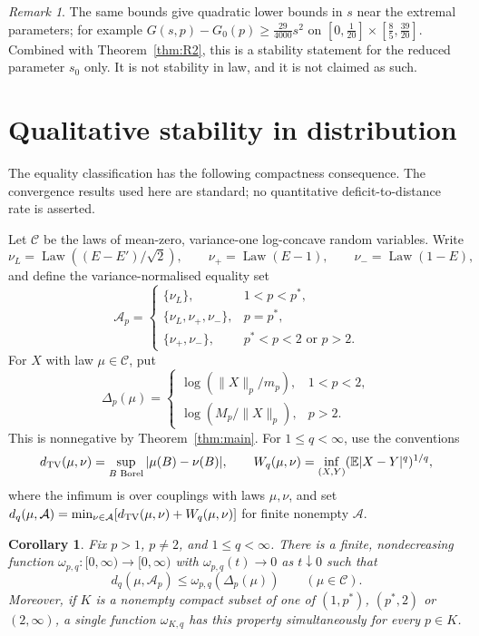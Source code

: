 \documentclass[11pt]{article}
\newtheorem{corollary}[theorem]{Corollary}
\theoremstyle{remark}
\newtheorem{remark}[theorem]{Remark}
\newcommand{\E}{\mathbb E}
\begin{document}
\begin{remark}
The same bounds give quadratic lower bounds in $s$ near the extremal parameters; for example $G(s,p)-G_0(p)\ge\frac{29}{4000}s^2$ on $[0,\frac1{20}]\times[\frac85,\frac{39}{20}]$. Combined with Theorem~\ref{thm:R2}, this is a stability statement for the reduced parameter $s_0$ only. It is not stability in law, and it is not claimed as such.
\end{remark}


\section{Qualitative stability in distribution}\label{sec:stability}
The equality classification has the following compactness consequence.
The convergence results used here are standard; no quantitative
deficit-to-distance rate is asserted.

Let $\mathcal C$ be the laws of mean-zero, variance-one log-concave
random variables. Write
\[
 \nu_L=\operatorname{Law}((E-E')/\sqrt2),\qquad
 \nu_+=\operatorname{Law}(E-1),\qquad
 \nu_-=\operatorname{Law}(1-E),
\]
and define the variance-normalised equality set
\[
 \mathcal A_p=
 \begin{cases}
 \{\nu_L\},&1<p<p^*,\\
 \{\nu_L,\nu_+,\nu_-\},&p=p^*,\\
 \{\nu_+,\nu_-\},&p^*<p<2\text{ or }p>2.
 \end{cases}
\]
For $X$ with law $\mu\in\mathcal C$, put
\[
 \Delta_p(\mu)=
 \begin{cases}
 \log(\|X\|_p/m_p),&1<p<2,\\
 \log(M_p/\|X\|_p),&p>2.
 \end{cases}
\]
This is nonnegative by Theorem~\ref{thm:main}. For $1\le q<\infty$,
use the conventions
\[
 d_{\rm TV}(\mu,\nu)=\sup_{B\text{ Borel}}|\mu(B)-\nu(B)|,
 \qquad
 W_q(\mu,\nu)=\inf_{(X,Y)}(\E|X-Y|^q)^{1/q},
\]
where the infimum is over couplings with laws $\mu,\nu$, and set
$d_q(\mu,\mathcal A)=\min_{\nu\in\mathcal A}
[d_{\rm TV}(\mu,\nu)+W_q(\mu,\nu)]$ for finite nonempty $\mathcal A$.

\begin{corollary}\label{cor:distributional-stability}
Fix $p>1$, $p\ne2$, and $1\le q<\infty$. There is a finite,
nondecreasing function $\omega_{p,q}:[0,\infty)\to[0,\infty)$ with
$\omega_{p,q}(t)\to0$ as $t\downarrow0$ such that
\[
 d_q(\mu,\mathcal A_p)\le\omega_{p,q}(\Delta_p(\mu))
 \qquad(\mu\in\mathcal C).
\]
Moreover, if $K$ is a nonempty compact subset of one of
$(1,p^*)$, $(p^*,2)$ or $(2,\infty)$, a single function
$\omega_{K,q}$ has this property simultaneously for every $p\in K$.
\end{corollary}
\end{document}

